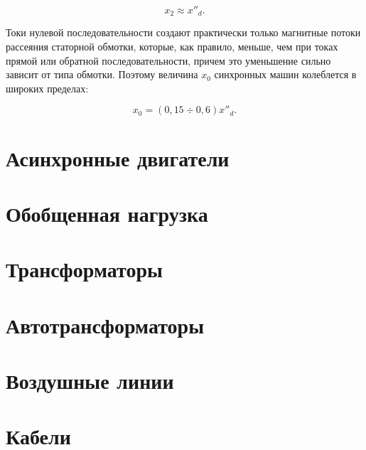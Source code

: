 \begin{equation}
	x_2 \approx x''_d \text{.}
	\label{eq:12-4}
\end{equation}

Токи нулевой последовательности создают практически только магнитные потоки рассеяния статорной обмотки, которые, как правило, меньше, чем при токах прямой или обратной последовательности, причем это уменьшение сильно зависит от типа обмотки. Поэтому величина $ x_0 $ синхронных машин колеблется в широких пределах:

\begin{equation}
	x_0 = (0,15 \div 0,6) x''_d \text{.}
	\label{eq:12-5}
\end{equation}

\section{Асинхронные двигатели}
\label{sec:12-3}


\section{Обобщенная нагрузка}
\label{sec:12-4}


\section{Трансформаторы}
\label{sec:12-5}


\section{Автотрансформаторы}
\label{sec:12-6}


\section{Воздушные линии}
\label{sec:12-7}


\section{Кабели}
\label{sec:12-8}